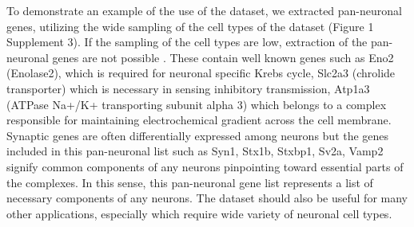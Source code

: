  To demonstrate an example of the use of the dataset, we extracted pan-neuronal genes, utilizing the wide sampling of the cell types of the dataset (Figure 1 Supplement 3). If the sampling of the cell types are low, extraction of the pan-neuronal genes are not possible \cite{Mo_2015}.  These contain well known genes such as Eno2 (Enolase2), which is required for neuronal specific Krebs cycle, Slc2a3 (chrolide transporter) which is necessary in sensing inhibitory transmission, Atp1a3 (ATPase Na+/K+ transporting subunit alpha 3) which belongs to a complex responsible for maintaining electrochemical gradient across the cell membrane. Synaptic genes are often differentially expressed among neurons but the genes included in this pan-neuronal list such as Syn1, Stx1b, Stxbp1, Sv2a, Vamp2 signify common components of any neurons pinpointing toward essential parts of the complexes. In this sense, this pan-neuronal gene list represents a list of necessary components of any neurons. The dataset should also be useful for many other applications, especially which require wide variety of neuronal cell types. 

